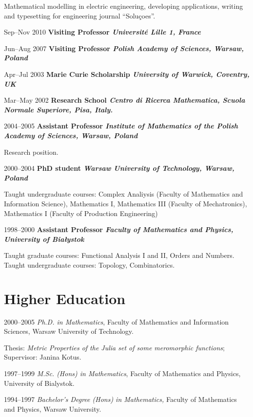 \documentclass{article}
\begin{document}
\begin{CV}
  Mathematical modelling in electric engineering, developing
  applications,  writing and typesetting for engineering journal
  ``Soluçoes''.


\item[Sep--Nov 2010] {\bf Visiting Professor \it Universit{\'e} Lille 1, France}
  
\item[Jun--Aug 2007] {\bf Visiting Professor \it Polish Academy of Sciences, Warsaw, Poland}

\item[Apr--Jul 2003] {\bf Marie Curie Scholarship \it University of Warwick, Coventry, UK}
    
\item[Mar--May 2002] {\bf Research School \it Centro di Ricerca Mathematica, Scuola Normale
    Superiore, Pisa, Italy.}


\item[2004--2005] {\bf Assistant Professor \it Institute of Mathematics of the Polish Academy of
    Sciences, Warsaw, Poland}

  Research position.
  
\item[2000--2004] {\bf PhD student \it Warsaw University of Technology, Warsaw, Poland}

  Taught undergraduate courses: Complex Analiysis (Faculty of
  Mathematics and Information Science), Mathematics I, Mathematics III
  (Faculty of Mechatronics), Mathematics I (Faculty of Production Engineering)

\item[1998--2000] {\bf Assistant Professor \it Faculty of Mathematics and Physics, University
    of Bia{\l}ystok}

  Taught graduate courses: Functional Analysis I and II, Orders and
  Numbers.  Taught undergraduate courses: Topology, Combinatorics.

\end{CV}



\section{Higher Education}
\begin{CV}
\item[2000--2005] \emph{Ph.D. in Mathematics}, Faculty of Mathematics and
  Information Sciences, Warsaw University of Technology.

  Thesis: \emph{Metric Properties of the Julia set of some meromorphic
    functions}; Supervisor: Janina Kotus.

\item[1997--1999] \emph{M.Sc. (Hons) in Mathematics}, Faculty of Mathematics
  and Physics, University of Bialystok.

\item[1994--1997] {\em Bachelor's Degree (Hons) in Mathematics,} Faculty of
  Mathematics and Physics, Warsaw University.

\end{CV}
\end{document}
